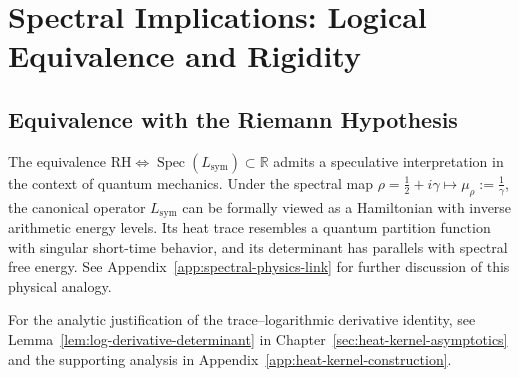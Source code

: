 \section{Spectral Implications: Logical Equivalence and Rigidity}
\label{sec:spectral-implications}



\subsection{Equivalence with the Riemann Hypothesis}













\begin{remark}
The equivalence \( \mathrm{RH} \iff \operatorname{Spec}(L_{\mathrm{sym}}) \subset \mathbb{R} \) admits a speculative interpretation in the context of quantum mechanics. Under the spectral map \( \rho = \tfrac{1}{2} + i\gamma \mapsto \mu_\rho := \tfrac{1}{\gamma} \), the canonical operator \( L_{\mathrm{sym}} \) can be formally viewed as a Hamiltonian with inverse arithmetic energy levels. Its heat trace resembles a quantum partition function with singular short-time behavior, and its determinant has parallels with spectral free energy. See Appendix~\ref{app:spectral-physics-link} for further discussion of this physical analogy.
\end{remark}

\medskip
\noindent
For the analytic justification of the trace–logarithmic derivative identity, see Lemma~\ref{lem:log-derivative-determinant} in Chapter~\ref{sec:heat-kernel-asymptotics} and the supporting analysis in Appendix~\ref{app:heat-kernel-construction}.

